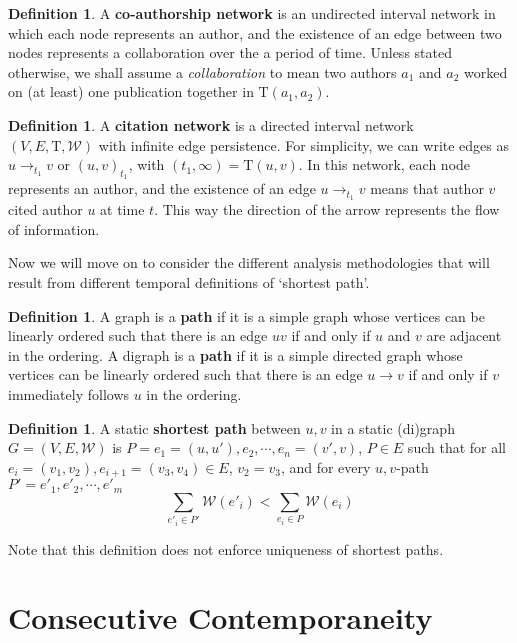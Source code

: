 \documentclass{article}
\theoremstyle{definition}
\newtheorem{defn}[thm]{Definition}
\numberwithin{thm}{subsection}
\newcommand{\W}{\mathcal{W}}
\newcommand{\T}{\text{T}}
\begin{document}
\begin{defn}
  A \textbf{co-authorship network} is an undirected interval network in which
  each node represents an author, and the existence of an edge between two nodes
  represents a collaboration over the a period of time. Unless stated otherwise,
  we shall assume a \textit{collaboration} to mean two authors $a_1$ and $a_2$
  worked on (at least) one publication together in $\T(a_1,a_2)$.
\end{defn}

\begin{defn}
  A \textbf{citation network} is a directed interval network \\ $(V,E,\T,\W)$ with
  infinite edge persistence. For simplicity, we can write edges as $u \to_{t_1}
  v$ or $(u,v)_{t_1}$, with $(t_1,\infty) = \T(u,v)$. In this network, each node
  represents an author, and the existence of an edge $u \to_{t_1} v$ means that
  author $v$ cited author $u$ at time $t$. This way the direction of the arrow
  represents the flow of information.
\end{defn}


Now we will move on to consider the different analysis methodologies that will
result from different temporal definitions of `shortest path'.

\begin{defn}
  A graph is a \textbf{path} if it is a simple graph whose vertices can be linearly
  ordered such that there is an edge $uv$ if and only if $u$ and $v$ are adjacent
  in the ordering.
  A digraph is a \textbf{path} if it is a simple directed graph whose vertices
  can be linearly ordered such that there is an edge $u \to v$ if and only if
  $v$ immediately follows $u$ in the ordering.
\end{defn}

\begin{defn}
 A static \textbf{shortest path} between $u,v$ in a static (di)graph
 $G = (V,E,\W)$ is $P = e_1 = (u,u'), e_2, \cdots, e_n = (v',v)$,
 $P \in E$ such that for all $e_i = (v_1,v_2), e_{i+1} = (v_3,v_4) \in E$,
 $v_2 = v_3$, and for every $u,v$-path $P' = e'_1, e'_2, \cdots, e'_m$
  \[\sum_{e'_i \in P'} \W(e'_i) < \sum_{e_i \in P} \W(e_i) \]
 \end{defn}

Note that this definition does not enforce uniqueness of shortest paths.

\section{Consecutive Contemporaneity}
\end{document}

